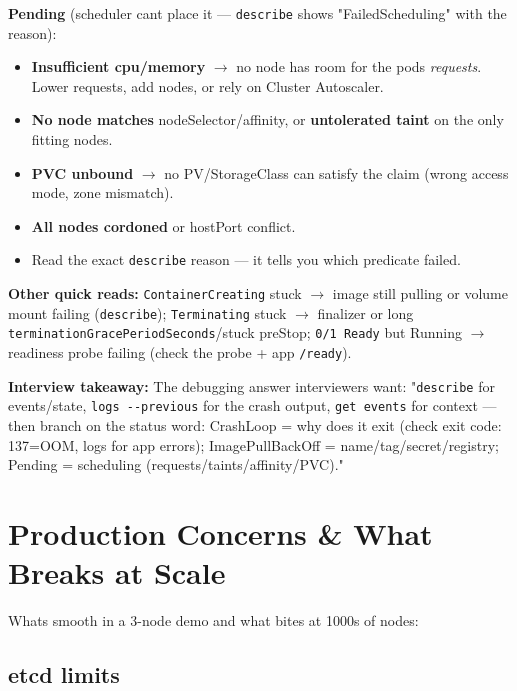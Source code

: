 \documentclass[11pt]{article}
\providecommand{\tightlist}{\setlength{\itemsep}{1pt}\setlength{\parskip}{0pt}}
\begin{document}
\textbf{Pending} (scheduler can\textquotesingle t place it --- \texttt{describe} shows "FailedScheduling" with the reason):

\begin{itemize}
\tightlist
\item
  \textbf{Insufficient cpu/memory} \(\rightarrow\) no node has room for the pod\textquotesingle s \emph{requests}. Lower requests, add nodes, or rely on Cluster Autoscaler.
\item
  \textbf{No node matches} nodeSelector/affinity, or \textbf{untolerated taint} on the only fitting nodes.
\item
  \textbf{PVC unbound} \(\rightarrow\) no PV/StorageClass can satisfy the claim (wrong access mode, zone mismatch).
\item
  \textbf{All nodes cordoned} or hostPort conflict.
\item
  Read the exact \texttt{describe} reason --- it tells you which predicate failed.
\end{itemize}

\textbf{Other quick reads:} \texttt{ContainerCreating} stuck \(\rightarrow\) image still pulling or volume mount failing (\texttt{describe}); \texttt{Terminating} stuck \(\rightarrow\) finalizer or long \texttt{terminationGracePeriodSeconds}/stuck preStop; \texttt{0/1\ Ready} but Running \(\rightarrow\) readiness probe failing (check the probe + app \texttt{/ready}).

\textbf{Interview takeaway:} The debugging answer interviewers want: "\texttt{describe} for events/state, \texttt{logs\ -\/-previous} for the crash output, \texttt{get\ events} for context --- then branch on the status word: CrashLoop = why does it exit (check exit code: 137=OOM, logs for app errors); ImagePullBackOff = name/tag/secret/registry; Pending = scheduling (requests/taints/affinity/PVC)."

\section{Production Concerns \& What Breaks at Scale}\label{production-concerns--what-breaks-at-scale}

What\textquotesingle s smooth in a 3-node demo and what bites at 1000s of nodes:

\subsection{etcd limits}\label{etcd-limits}
\end{document}
